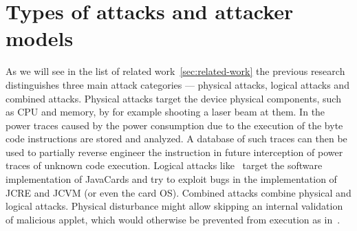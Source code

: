 {    %






    \section{Types of attacks and attacker models}

    As we will see in the list of related work~\ref{sec:related-work} the previous research distinguishes three main attack categories --- physical attacks, logical attacks and combined attacks. Physical attacks target the device physical components, such as CPU and memory, by for example shooting a laser beam at them. In \cite{Prpič2010thesis} the power traces caused by the power consumption due to the execution of the byte code instructions are stored and analyzed. A database of such traces can then be used to partially reverse engineer the instruction in future interception of power traces of unknown code execution.
    Logical attacks like~\cite{hogenboom} target the software implementation of JavaCards and try to exploit bugs in the implementation of JCRE and JCVM (or even the card OS). Combined attacks combine physical and logical attacks. Physical disturbance might allow skipping an internal validation of malicious applet, which would otherwise be prevented from execution as in~\cite{barbusecond}.


}
